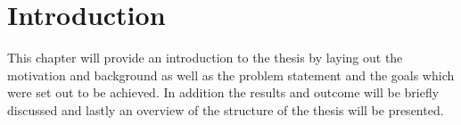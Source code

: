 \chapter{Introduction}
This chapter will provide an introduction to the thesis by laying out the motivation and background as well as the problem statement and the goals which were set out to be achieved. In addition the results and outcome will be briefly discussed and lastly an overview of the structure of the thesis will be presented. 







